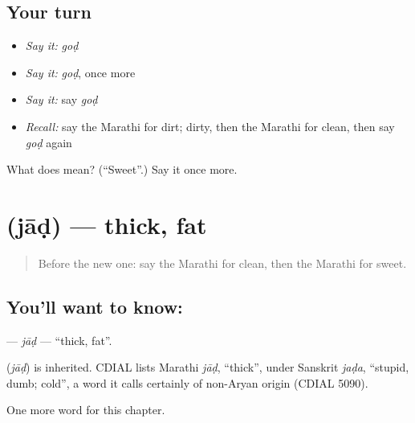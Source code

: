 \subsection*{Your turn}
\begin{itemize}
\raggedright
  \item \emph{Say it:} \emph{goḍ}
  \item \emph{Say it:} \emph{goḍ}, once more
  \item \emph{Say it:} say \emph{goḍ}
  \item \emph{Recall:} say the Marathi for dirt; dirty, then the Marathi for clean, then say \emph{goḍ} again
\end{itemize}

\begin{tcolorbox}[breakable,colback=teal!4,colframe=teal!35!black,title={Before you move on}]
What does  mean? (\textquotedblleft{}Sweet\textquotedblright{}.) Say it once more.
\end{tcolorbox}
\section[\texorpdfstring{\mr{जाड} (jāḍ)}{जाड (jāḍ)}]{ (jāḍ) — thick, fat}

\label{lesson:MR-C106-jad}



\begin{quote}
Before the new one: say the Marathi for clean, then the Marathi for sweet.
\end{quote}

\subsection*{You'll want to know: }
\textbf{} — \emph{jāḍ} — \textquotedblleft{}thick, fat\textquotedblright{}.

\begin{cousinweb}
\textbf{} (\emph{jāḍ}) is inherited. CDIAL lists Marathi \emph{jāḍ}, \textquotedblleft{}thick\textquotedblright{}, under Sanskrit \emph{jaḍa}, \textquotedblleft{}stupid, dumb; cold\textquotedblright{}, a word it calls certainly of non-Aryan origin (CDIAL 5090).
\end{cousinweb}

\begin{grammarlens}[title={What you've built}]
One more word for this chapter.
\end{grammarlens}

